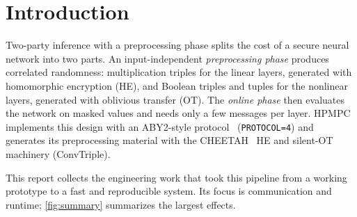 \documentclass[10pt,a4paper]{article}
\newcommand{\flag}[1]{\nolinkurl{#1}}
\newcommand{\ms}{\,ms\xspace}
\begin{document}
\begin{abstract}
output repacking cuts the conv triples' traffic by 40\%. On a GPU, the packed pipeline's evaluator produces the conv
triples $2.1$--$2.3\times$ faster than the CPU and $5.6$--$7.0\times$ faster than the previous GPU path. With ferret's
extensions and the random OTs' hashing on the GPU as well, bit for bit emp's, preprocessing on one machine shared by
both parties is $1.7$--$2.2\times$ faster than on its CPU in single batch and $2.1$--$2.4\times$ in multi-batch, and the
online conv products build their column matrix on the GPU. Exact truncation (TE0, TE1) now runs in 2PC, fused into the
ReLU without a message of its own, and classifies like the reduced-slack TS1. The 2PC configurations also run with 64-bit
rings: BFV with $t = 2^{64}$ outside SEAL, the cut as narrow adders, the reshare bake, and HE arithmetic triples with
64-bit shares, at $1.7$--$2.1\times$ the traffic and the plaintext model's accuracy at $F = 12$; the narrow adders also
fixed a 32-bit DReLU bug of the prefix adders under the A2B bake. TS1, TE1 and TE0 are stated as protocols with proofs
and a communication analysis. The number of zero-addition gates of function-dependent preprocessing is the rank
deficiency of a GF(2) matrix; an elimination algorithm attains it, and the circuit generator is at that minimum for
every adder. With output repacking, preprocessing in a 20\ms / 200\,Mbit/s WAN is 14--20\% faster.
\end{abstract}

\section{Introduction}

Two-party inference with a preprocessing phase splits the cost of a secure neural network into two
parts. An input-independent \emph{preprocessing phase} produces correlated randomness: multiplication
triples for the linear layers, generated with homomorphic encryption (HE), and Boolean triples and
tuples for the nonlinear layers, generated with oblivious transfer (OT). The \emph{online phase} then
evaluates the network on masked values and needs only a few messages per layer. HPMPC implements this
design with an ABY2-style protocol~\cite{aby2} (\flag{PROTOCOL=4}) and generates its preprocessing
material with the CHEETAH~\cite{cheetah} HE and silent-OT~\cite{ferret} machinery (ConvTriple).

This report collects the engineering work that took this pipeline from a working prototype to a fast
and reproducible system. Its focus is communication and runtime; \cref{fig:summary} summarizes the largest effects.
\end{document}
